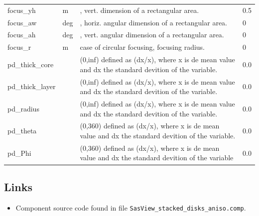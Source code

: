 \begin{longtable}{p{}p{}p{}p{}}
focus\_yh & m & , vert. dimension of a rectangular area. & 0.5 \\
focus\_aw & deg & , horiz. angular dimension of a rectangular area. & 0 \\
focus\_ah & deg & , vert. angular dimension of a rectangular area. & 0 \\
focus\_r & m & case of circular focusing, focusing radius. & 0 \\
pd\_thick\_core &  & (0,inf) defined as (dx/x), where x is de mean value and dx the standard devition of the variable. & 0.0 \\
pd\_thick\_layer &  & (0,inf) defined as (dx/x), where x is de mean value and dx the standard devition of the variable. & 0.0 \\
pd\_radius &  & (0,inf) defined as (dx/x), where x is de mean value and dx the standard devition of the variable. & 0.0 \\
pd\_theta &  & (0,360) defined as (dx/x), where x is de mean value and dx the standard devition of the variable. & 0.0 \\
pd\_Phi &  & (0,360) defined as (dx/x), where x is de mean value and dx the standard devition of the variable & 0.0 \\
\bottomrule
\end{longtable}

\subsection*{Links}
\begin{itemize}
  \item Component source code found in file \texttt{SasView\_stacked\_disks\_aniso.comp}.
\end{itemize}
